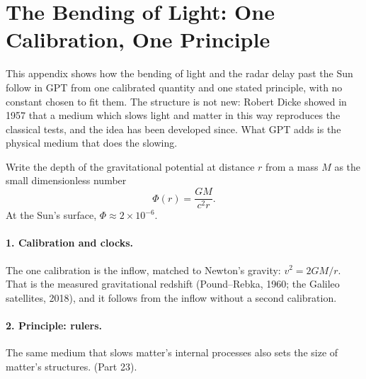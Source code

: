 \documentclass[11pt,a4paper]{article}
\renewcommand{\thesection}{\gptpart.\arabic{section}}
\begin{document}
\clearpage
\appendix
\renewcommand{\thesection}{1.\Alph{section}}
\section{The Bending of Light: One Calibration, One Principle}

This appendix shows how the bending of light and the radar delay past the Sun follow in GPT from one calibrated quantity and one stated principle, with no constant chosen to fit them. The structure is not new: Robert Dicke showed in 1957 that a medium which slows light and matter in this way reproduces the classical tests, and the idea has been developed since. What GPT adds is the physical medium that does the slowing.

Write the depth of the gravitational potential at distance $r$ from a mass $M$ as the small dimensionless number
\[
\Phi(r) = \frac{GM}{c^2 r}.
\]
At the Sun's surface, $\Phi \approx 2\times10^{-6}$.

\paragraph{1. Calibration and clocks.} The one calibration is the inflow, matched to Newton's gravity: $v^2 = 2GM/r$.  That is the measured gravitational redshift (Pound--Rebka, 1960; the Galileo satellites, 2018), and it follows from the inflow without a second calibration. 

\paragraph{2. Principle: rulers.} The same medium that slows matter's internal processes also sets the size of matter's structures.  (Part 23). 
\end{document}
